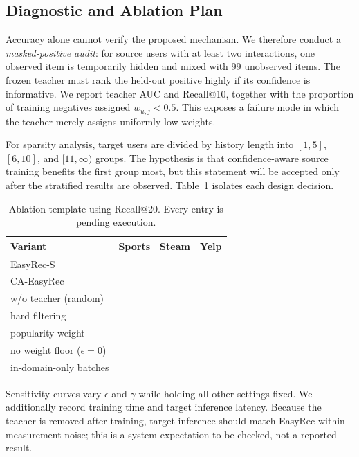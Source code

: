 \documentclass[11pt]{article}
\newcommand{\method}{CA-EasyRec}
\newcommand{\pending}{\textemdash}
\begin{document}
\subsection{Diagnostic and Ablation Plan}

Accuracy alone cannot verify the proposed mechanism.
We therefore conduct a \emph{masked-positive audit}: for source users with at least two interactions, one observed item is temporarily hidden and mixed with 99 unobserved items.
The frozen teacher must rank the held-out positive highly if its confidence is informative.
We report teacher AUC and Recall@10, together with the proportion of training negatives assigned $w_{u,j}<0.5$.
This exposes a failure mode in which the teacher merely assigns uniformly low weights.

For sparsity analysis, target users are divided by history length into $[1,5]$, $[6,10]$, and $[11,\infty)$ groups.
The hypothesis is that confidence-aware source training benefits the first group most, but this statement will be accepted only after the stratified results are observed.
Table~\ref{tab:ablation} isolates each design decision.

\begin{table}[t]
\centering
\small
\begin{tabular}{lccc}
\toprule
Variant & Sports & Steam & Yelp \\
\midrule
EasyRec-S & \pending & \pending & \pending \\
\method{} & \pending & \pending & \pending \\
\quad w/o teacher (random) & \pending & \pending & \pending \\
\quad hard filtering & \pending & \pending & \pending \\
\quad popularity weight & \pending & \pending & \pending \\
\quad no weight floor ($\epsilon=0$) & \pending & \pending & \pending \\
\quad in-domain-only batches & \pending & \pending & \pending \\
\bottomrule
\end{tabular}
\caption{Ablation template using Recall@20. Every entry is pending execution.}
\label{tab:ablation}
\end{table}

Sensitivity curves vary $\epsilon$ and $\gamma$ while holding all other settings fixed.
We additionally record training time and target inference latency.
Because the teacher is removed after training, target inference should match EasyRec within measurement noise; this is a system expectation to be checked, not a reported result.
\end{document}
